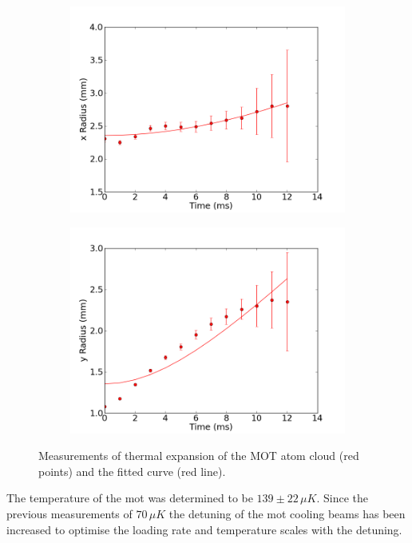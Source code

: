\begin{figure}[h]
\begin{subfigure}[b]{0.5\textwidth}
    \includegraphics[width=\textwidth]{figs/final_temp_fitting_x.png}
\end{subfigure}\begin{subfigure}[b]{0.5\textwidth}
    \includegraphics[width=\textwidth]{figs/final_temp_fitting_y.png}
\end{subfigure}
\caption{Measurements of thermal expansion of the MOT atom cloud (red points) and the fitted curve (red line).}
\label{fig:temp_fits}
\end{figure}

The temperature of the \gls{mot} was determined to be $139\pm22\,\unit{\mu K}$. Since the previous measurements of $70\,\unit{\mu K}$\cite{sheludko_shaped_2010} the detuning of the \gls{mot} cooling beams has been increased to optimise the loading rate and temperature scales with the detuning.

